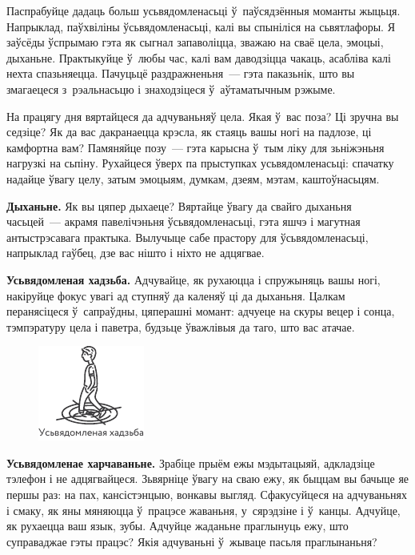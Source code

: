 Паспрабуйце дадаць больш усьвядомленасьці ў~паўсядзённыя моманты жыцьця. Напрыклад, паўхвіліны ўсьвядомленасьці, калі вы спыніліся на сьвятлафоры. Я заўсёды ўспрымаю гэта як сыгнал запаволіцца, зважаю на сваё цела, эмоцыі, дыханьне. Практыкуйце ў~любы час, калі вам даводзіцца чакаць, асабліва калі нехта спазьняецца. Пачуцьцё раздражненьня~--- гэта паказьнік, што вы змагаецеся з~рэальнасьцю і знаходзіцеся ў~аўтаматычным рэжыме.

На працягу дня вяртайцеся да адчуваньняў цела. Якая ў~вас поза? Ці зручна вы седзіце? Як да вас дакранаецца крэсла, як стаяць вашы ногі на падлозе, ці камфортна вам? Памяняйце позу~--- гэта карысна ў~тым ліку для зьніжэньня нагрузкі на сьпіну. Рухайцеся ўверх па прыступках усьвядомленасьці: спачатку надайце ўвагу целу, затым эмоцыям, думкам, дзеям, мэтам, каштоўнасьцям.


\textbf{Дыханьне.} Як вы цяпер дыхаеце? Вяртайце ўвагу да свайго дыханьня часьцей~--- акрамя павелічэньня ўсьвядомленасьці, гэта яшчэ і магутная антыстрэсавага практыка. Вылучыце сабе прастору для ўсьвядомленасьці, напрыклад гаўбец, дзе вас нішто і ніхто не адцягвае.

\textbf{Усьвядомленая хадзьба.} Адчувайце, як рухаюцца і спружыняць вашы ногі, накіруйце фокус увагі ад ступняў да каленяў ці да дыханьня. Цалкам перанясіцеся ў~сапраўдны, цяперашні момант: адчуеце на скуры вецер і сонца, тэмпэратуру цела і паветра, будзьце ўважлівыя да таго, што вас атачае.

\begin{figure}[htb!]
  \centering
  \includegraphics[scale=1.5]{willpower/ch8/8.pdf}
\end{figure}

\textbf{Усьвядомленае харчаваньне.} Зрабіце прыём ежы мэдытацыяй, адкладзіце тэлефон і не адцягвайцеся. Зьвярніце ўвагу на сваю ежу, як быццам вы бачыце яе першы раз: на пах, кансістэнцыю, вонкавы выгляд. Сфакусуйцеся на адчуваньнях і смаку, як яны мяняюцца ў~працэсе жаваньня, у~сярэдзіне і ў~канцы. Адчуйце, як рухаецца ваш язык, зубы. Адчуйце жаданьне праглынуць ежу, што суправаджае гэты працэс? Якія адчуваньні ў~жываце пасьля праглынаньня?

